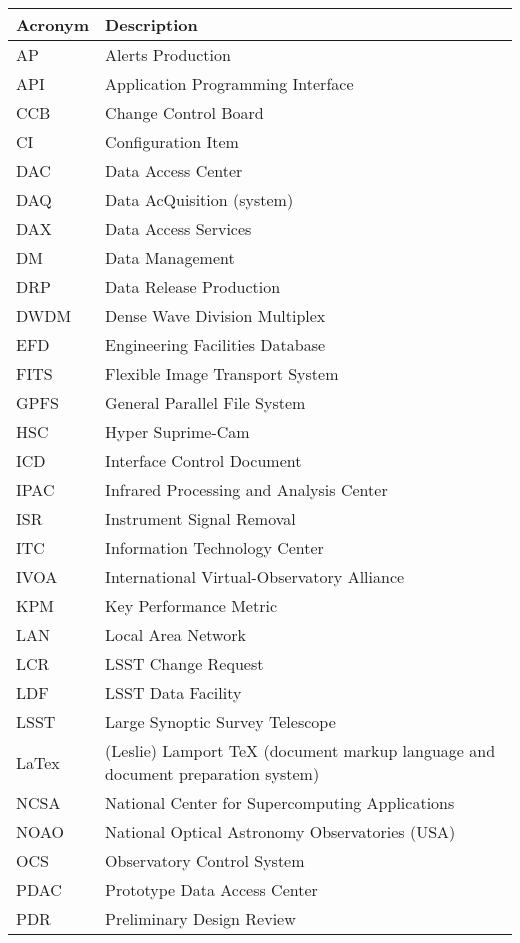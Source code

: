 \addtocounter{table}{-1}
\begin{longtable}{|l|p{}|}\hline 
\textbf{Acronym} & \textbf{Description}  \\\hline
AP&Alerts Production \\\hline
API&Application Programming Interface \\\hline
CCB&Change Control Board \\\hline
CI&Configuration Item \\\hline
DAC&Data Access Center \\\hline
DAQ&Data AcQuisition (system) \\\hline
DAX&Data Access Services \\\hline
DM&Data Management \\\hline
DRP&Data Release Production \\\hline
DWDM&Dense Wave Division Multiplex \\\hline
EFD&Engineering Facilities Database \\\hline
FITS&Flexible Image Transport System \\\hline
GPFS&General Parallel File System \\\hline
HSC&Hyper Suprime-Cam \\\hline
ICD&Interface Control Document \\\hline
IPAC&Infrared Processing and Analysis Center \\\hline
ISR&Instrument Signal Removal \\\hline
ITC&Information Technology Center \\\hline
IVOA&International Virtual-Observatory Alliance \\\hline
KPM&Key Performance Metric \\\hline
LAN&Local Area Network \\\hline
LCR&LSST Change Request \\\hline
LDF&LSST Data Facility \\\hline
LSST&Large Synoptic Survey Telescope \\\hline
LaTex&(Leslie) Lamport TeX (document markup language and document preparation system) \\\hline
NCSA&National Center for Supercomputing Applications \\\hline
NOAO&National Optical Astronomy Observatories (USA) \\\hline
OCS&Observatory Control System \\\hline
PDAC&Prototype Data Access Center \\\hline
PDR&Preliminary Design Review \\\hline

\end{longtable}
